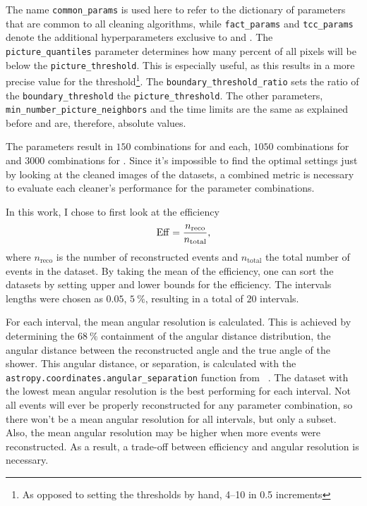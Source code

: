 The name \texttt{common\_params} is used here to refer to the dictionary of parameters that are common
to all cleaning algorithms, while \texttt{fact\_params} and \texttt{tcc\_params} denote the additional
hyperparameters exclusive to \fact{} and \tcc{}. The \texttt{picture\_quantiles} parameter determines
how many percent of all pixels will be below the \texttt{picture\_threshold}. This is especially useful,
as this results in a more precise value for the threshold\footnote{As opposed to setting the thresholds by hand, \eg{} \numrange{4}{10} in \num{0.5} increments}.
The \texttt{boundary\_threshold\_ratio} sets
the ratio of the \texttt{boundary\_threshold} \wrt{} the \texttt{picture\_threshold}. The other parameters,
\texttt{min\_number\_picture\_neighbors} and the time limits are the same as explained before and are,
therefore, absolute values.

The parameters result in \(\num{150}\) combinations for \tailcuts{} and \mars{} each, \(\num{1050}\) combinations for
\fact{} and \(\num{3000}\) combinations for \tcc{}.
Since it's impossible to find the optimal settings just by looking at the
cleaned images of the datasets, a combined metric is necessary to evaluate each cleaner's performance
for the parameter combinations.

In this work, I chose to first look at the efficiency
\begin{equation}\label{eq:efficiency}
    \operatorname{Eff} =  \frac{n_{\mathrm{reco}}}{n_{\mathrm{total}}},
\end{equation}
where \(n_{\mathrm{reco}}\) is the number of reconstructed events and \(n_{\mathrm{total}}\)
the total number of events in the dataset. By taking the mean of the efficiency, one can sort the
datasets by setting upper and lower bounds for the efficiency. The intervals lengths were chosen as
\(\num{0.05}\), \ie \(\SI{5}{\percent}\), resulting in a total of \(\num{20}\) intervals.

For each interval, the mean angular resolution is calculated. This is achieved by determining the
\(\SI{68}{\percent}\) containment of the angular distance distribution, \ie{} the angular distance
between the reconstructed angle and the true angle of the shower. This angular distance, or separation, is calculated
with the \texttt{astropy.coordinates.angular\_separation} function from \astropy{}~\cite{astropy1, astropy2}. The dataset with the lowest
mean angular resolution is the best performing for each interval. Not all events will ever be properly reconstructed
for any parameter combination, so there won't be a mean angular resolution for all intervals, but only
a subset. Also, the mean angular resolution may be higher when more events were reconstructed.
As a result, a trade-off between efficiency and angular resolution is necessary.

